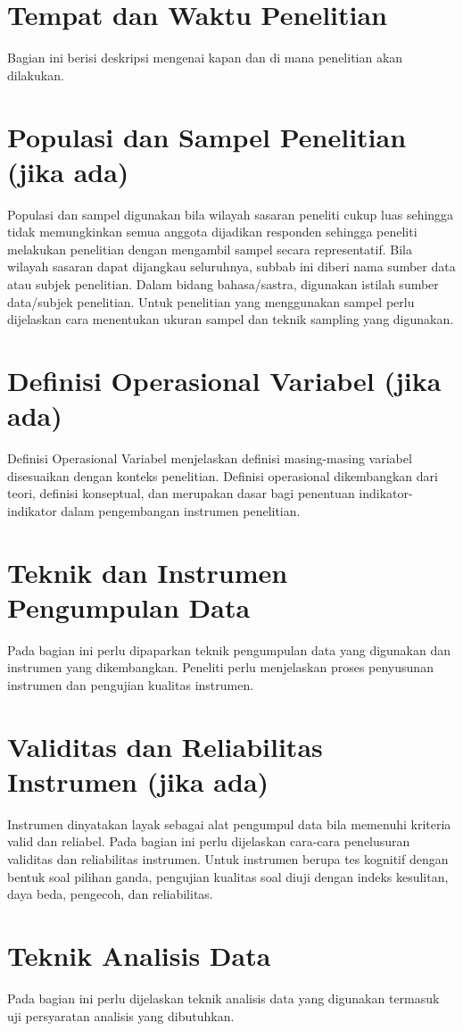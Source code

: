 \section{Tempat dan Waktu Penelitian}
Bagian ini berisi deskripsi mengenai kapan dan di mana penelitian akan dilakukan.
\section{Populasi dan Sampel Penelitian (jika ada)}
Populasi dan sampel digunakan bila wilayah sasaran peneliti cukup luas sehingga tidak memungkinkan semua anggota dijadikan responden sehingga peneliti melakukan penelitian dengan mengambil sampel secara representatif. Bila wilayah sasaran dapat dijangkau seluruhnya, subbab ini diberi nama sumber data atau subjek penelitian. Dalam bidang bahasa/sastra, digunakan istilah sumber data/subjek penelitian. Untuk penelitian yang menggunakan sampel perlu dijelaskan cara menentukan ukuran sampel dan teknik sampling yang digunakan.
\section{Definisi Operasional Variabel (jika ada)}
Definisi Operasional Variabel menjelaskan definisi masing-masing variabel disesuaikan dengan konteks penelitian. Definisi operasional dikembangkan dari teori, definisi konseptual, dan merupakan dasar bagi penentuan indikator- indikator dalam pengembangan instrumen penelitian.
\section{Teknik dan Instrumen Pengumpulan Data}
Pada bagian ini perlu dipaparkan teknik pengumpulan data yang digunakan dan instrumen yang dikembangkan. Peneliti perlu menjelaskan proses penyusunan instrumen dan pengujian kualitas instrumen.

\section{Validitas dan Reliabilitas Instrumen (jika ada)}
Instrumen dinyatakan layak sebagai alat pengumpul data bila memenuhi kriteria valid dan reliabel. Pada bagian ini perlu dijelaskan cara-cara penelusuran validitas dan reliabilitas instrumen. Untuk instrumen berupa tes kognitif dengan bentuk soal pilihan ganda, pengujian kualitas soal diuji dengan indeks kesulitan, daya beda, pengecoh, dan reliabilitas.
\section{Teknik Analisis Data}
Pada bagian ini perlu dijelaskan teknik analisis data yang digunakan termasuk uji persyaratan analisis yang dibutuhkan.
